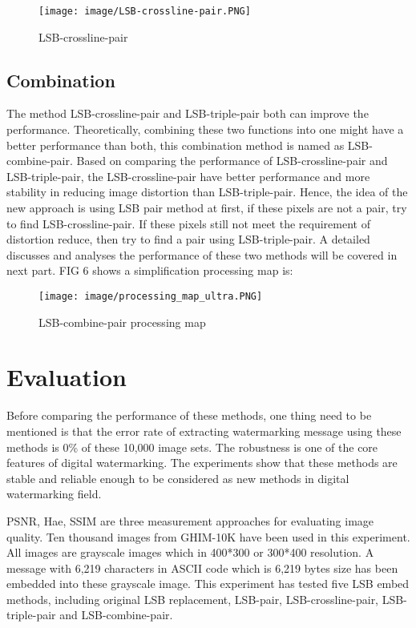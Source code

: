 \documentclass[%
    reprint,
    amsmath,amssymb,
    aps,
   ]{revtex4-1}
\begin{document}
   \begin{figure}[h]
   \texttt{[image: image/LSB-crossline-pair.PNG]}
   \caption{LSB-crossline-pair}
   \label{fig:figure}
   \end{figure}   
   
   
   
   
   \subsection{\label{sec:level2}Combination}
   
   The method LSB-crossline-pair and LSB-triple-pair both can improve the performance. Theoretically, combining these two functions into one might have a better performance than both, this combination method is named as LSB-combine-pair. Based on comparing the performance of LSB-crossline-pair and LSB-triple-pair, the LSB-crossline-pair have better performance and more stability in reducing image distortion than LSB-triple-pair. Hence, the idea of the new approach is using LSB pair method at first, if these pixels are not a pair, try to find LSB-crossline-pair. If these pixels still not meet the requirement of distortion reduce, then try to find a pair using LSB-triple-pair. A detailed discusses and analyses the performance of these two methods will be covered in next part. FIG 6 shows a simplification processing map is:
   
   \begin{figure}[h]
   \texttt{[image: image/processing\_map\_ultra.PNG]}
   \caption{LSB-combine-pair processing map}
   \label{fig:figure}
   \end{figure}   
   
   
   
       
   \section{\label{sec:level1}Evaluation}
   
   Before comparing the performance of these methods, one thing need to be mentioned is that the error rate of extracting watermarking message using these methods is 0\% of these 10,000 image sets. The robustness is one of the core features of digital watermarking. The experiments show that these methods are stable and reliable enough to be considered as new methods in digital watermarking field.
   
   PSNR, Hae, SSIM are three measurement approaches for evaluating image quality. Ten thousand images from GHIM-10K \cite{liu2015content} have been used in this experiment. All images are grayscale images which in 400*300 or 300*400 resolution. A message with 6,219 characters in ASCII code which is 6,219 bytes size has been embedded into these grayscale image. This experiment has tested five LSB embed methods, including original LSB replacement, LSB-pair, LSB-crossline-pair, LSB-triple-pair and LSB-combine-pair. 
   
\end{document}
